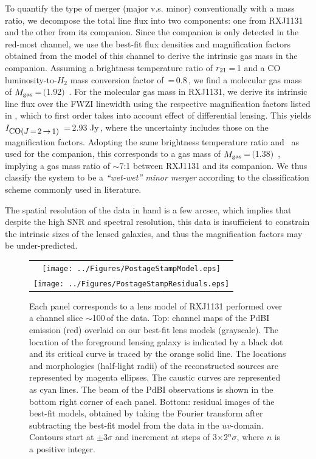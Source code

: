 \documentclass[]{emulateapj}
\begin{document}
To quantify the type of merger (major v.s. minor) conventionally with a mass
ratio, we decompose the total line flux into two components:
one from RXJ1131 and the other from its companion.
Since the companion is only detected in the red-most channel, we
use the best-fit flux densities and magnification factors obtained
from the model of this channel to derive the intrinsic gas mass in the companion.
Assuming a brightness temperature ratio of $r_{\rm 21}$\,=\,1 and
a CO luminosity-to-$H_2$ mass conversion factor of
\alphaco\,=\,0.8\,\alphaU, we find
a molecular gas mass of $M_{\rm gas}$\,=\,$($1.92$)$\, \Msun.
For the molecular gas mass in RXJ1131, we derive
its intrinsic line flux over the FWZI linewidth
using the respective magnification
factors listed in , which to
first order takes into account effect of differential lensing.
This yields $I_{\small \mbox{CO($J$\,=\,2\,$\rightarrow$\,1) }}$\,=\,2.93 Jy\,\kms,
where the uncertainty includes those on
the magnification factors.
Adopting the same brightness temperature ratio and \alphaco\ as
used for the companion, this corresponds to a gas mass of
$M_{\rm gas}$\,=\,$($1.38$)$\, \Msun,
implying a gas mass ratio of $\sim$7:1 between RXJ1131 and its companion.
We thus classify the system to be a {\em ``wet-wet'' minor merger} according to
the classification scheme commonly used in literature.

The spatial resolution of the data in hand
is a few arcsec, which implies that despite the high SNR and spectral
resolution, this data is insufficient to constrain the
intrinsic sizes of the lensed galaxies, and thus the magnification
factors may be under-predicted. %

\begin{figure}[tbph]
\centering
\begin{tabular}{c}
\texttt{[image: ../Figures/PostageStampModel.eps]} \\
\texttt{[image: ../Figures/PostageStampResiduals.eps]}
\end{tabular}
\caption{Each panel corresponds to a lens model of RXJ1131 performed over a
channel slice $\sim$100\,\kms of the \bco data. Top: channel maps of the
PdBI \bco emission (red) overlaid on our best-fit lens models (grayscale).
The location of the foreground lensing galaxy is indicated by a black dot and
its critical curve is traced by the orange solid line. The locations and
morphologies (half-light radii) of the reconstructed sources are
represented by magenta ellipses.
The caustic curves are represented as cyan lines. The beam of the
PdBI observations is shown in the bottom right corner of each panel.
Bottom: residual images of the best-fit models, obtained by
taking the Fourier transform after subtracting the best-fit model from the
data in the $uv$-domain. Contours start
at $\pm$3$\sigma$ and increment at steps of 3$\times$2$^n\sigma$,
where $n$ is a positive integer.
\label{fig:model}}
\end{figure}
\end{document}
